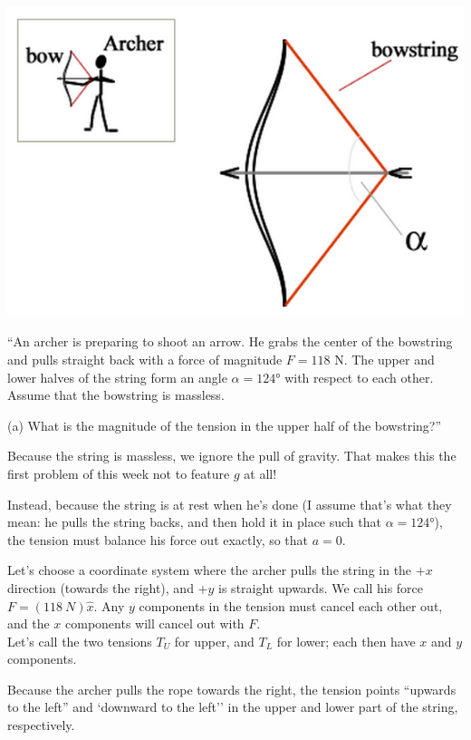 \documentclass[8.01x]{subfiles}
\begin{document}
\begin{center}
\includegraphics[scale=0.5]{Graphics/h3p4}
\end{center}

``An archer is preparing to shoot an arrow. He grabs the center of the bowstring and pulls straight back with a force of magnitude $F = 118$ N. The upper and lower halves of the string form an angle $\alpha = \ang{124}$ with respect to each other. Assume that the bowstring is massless.

(a) What is the magnitude of the tension in the upper half of the bowstring?''

Because the string is massless, we ignore the pull of gravity. That makes this the first problem of this week not to feature $g$ at all!	

Instead, because the string is at rest when he's done (I assume that's what they mean: he pulls the string backs, and then hold it in place such that $\alpha = \ang{124}$), the tension must balance his force out exactly, so that $a = 0$.

Let's choose a coordinate system where the archer pulls the string in the $+x$ direction (towards the right), and $+y$ is straight upwards. We call his force $F = (\SI{118}{N}) \hat{x}$. Any $y$ components in the tension must cancel each other out, and the $x$ components will cancel out with $F$.\\
Let's call the two tensions $T_U$ for upper, and $T_L$ for lower; each then have $x$ and $y$ components.

Because the archer pulls the rope towards the right, the tension points ``upwards to the left'' and `downward to the left'' in the upper and lower part of the string, respectively.
\end{document}
